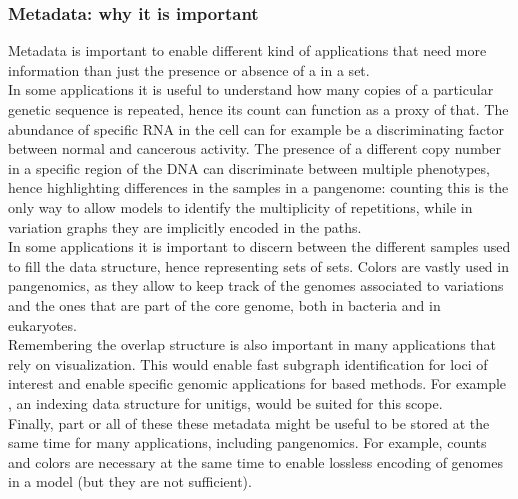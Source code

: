 \subsubsection{Metadata: why it is important}
Metadata is important to enable different kind of applications that need more information than just the presence or absence of a \kmer in a set. \\
In some applications it is useful to understand how many copies of a particular genetic sequence is repeated, hence its \kmer count can function as a proxy of that. The abundance of specific RNA in the cell can for example be a discriminating factor between normal and cancerous activity. The presence of a different copy number in a specific region of the DNA can discriminate between multiple phenotypes, hence highlighting differences in the samples in a pangenome: counting \kmers this is the only way to allow \dbg models to identify the multiplicity of repetitions, while in variation graphs they are implicitly encoded in the paths.\\
In some applications it is important to discern between the different samples used to fill the data structure, hence representing sets of \kmer sets. Colors are vastly used in pangenomics, as they allow to keep track of the genomes associated to variations and the ones that are part of the core genome, both in bacteria and in eukaryotes.\\
Remembering the \dbg overlap structure is also important in many applications that rely on visualization. This would enable fast subgraph identification for loci of interest and enable specific genomic applications for \dbg based methods. For example \ssh, an indexing data structure for unitigs, would be suited for this scope.\\
Finally, part or all of these these metadata might be useful to be stored at the same time for many applications, including pangenomics. For example, \kmer counts and colors are necessary at the same time to enable lossless encoding of genomes in a \dbg model (but they are not sufficient).

